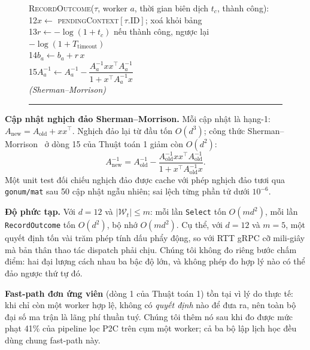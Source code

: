 \documentclass[final,5p,times,twocolumn]{elsarticle}
\begin{document}
\begin{figure}[H]
\begin{minipage}{\columnwidth}
\noindent\textsc{RecordOutcome}($\tau$, worker $a$, thời gian biên dịch $t_c$, thành công):\\
\hspace*{0.3em}12\quad $x\leftarrow$ \textsc{pendingContext}$[\tau.\text{ID}]$; xoá khỏi bảng\\
\hspace*{0.3em}13\quad $r\leftarrow-\log(1+t_c)$ nếu thành công, ngược lại $-\log(1+T_{\text{timeout}})$\\
\hspace*{0.3em}14\quad $b_a\leftarrow b_a+r\,x$\\
\hspace*{0.3em}15\quad $A_a^{-1}\leftarrow A_a^{-1}-\dfrac{A_a^{-1}xx^\top A_a^{-1}}{1+x^\top A_a^{-1}x}$\\
\hspace*{2.2em}\textit{(Sherman--Morrison)}
\vspace{3pt}\hrule
\end{minipage}
\label{alg:hglinucb}
\end{figure}

\textbf{Cập nhật nghịch đảo Sherman--Morrison.} Mỗi cập nhật là hạng-1: $A_{\text{new}}=A_{\text{old}}+xx^\top$. Nghịch đảo lại từ đầu tốn $O(d^3)$; công thức Sherman--Morrison~\cite{sherman1950} ở dòng 15 của Thuật toán 1 giảm còn $O(d^2)$:
\begin{equation}
A_{\text{new}}^{-1}=A_{\text{old}}^{-1}-\frac{A_{\text{old}}^{-1}xx^\top A_{\text{old}}^{-1}}{1+x^\top A_{\text{old}}^{-1}x}.
\end{equation}
Một unit test đối chiếu nghịch đảo được cache với phép nghịch đảo tươi qua \texttt{gonum/mat} sau 50 cập nhật ngẫu nhiên; sai lệch từng phần tử dưới $10^{-6}$.

\textbf{Độ phức tạp.} Với $d=12$ và $|\mathcal{W}_t|\le m$: mỗi lần \texttt{Select} tốn $O(md^2)$, mỗi lần \texttt{RecordOutcome} tốn $O(d^2)$, bộ nhớ $O(md^2)$. Cụ thể, với $d=12$ và $m=5$, một quyết định tốn vài trăm phép tính dấu phẩy động, so với RTT gRPC cỡ mili-giây mà bản thân thao tác dispatch phải chịu. Chúng tôi không đo riêng bước chấm điểm: hai đại lượng cách nhau ba bậc độ lớn, và không phép đo hợp lý nào có thể đảo ngược thứ tự đó.

\textbf{Fast-path đơn ứng viên} (dòng 1 của Thuật toán 1) tồn tại vì lý do thực tế: khi chỉ còn một worker hợp lệ, không có \emph{quyết định} nào để đưa ra, nên toàn bộ đại số ma trận là lãng phí thuần tuý. Chúng tôi thêm nó sau khi đo được mức phạt 41\% của pipeline lọc P2C trên cụm một worker; cả ba bộ lập lịch học đều dùng chung fast-path này.
\end{document}
